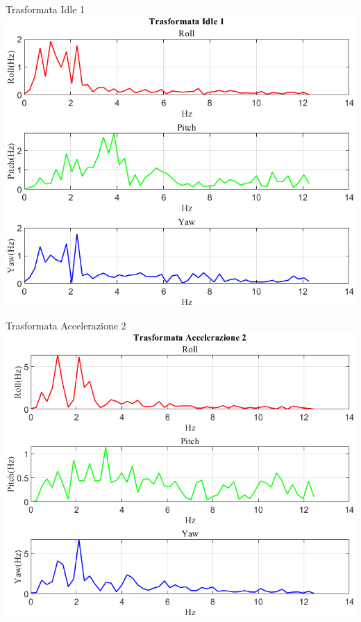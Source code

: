 \documentclass[beamer]{standalone}
\begin{document}
	\begin{frame}{{Trasformata Idle 1}}
		\centering\includegraphics[height=.8\textheight]{figure/VAng/Trasformata/Trasformata Idle 1}
	\end{frame}
	
	\begin{frame}{{Trasformata Accelerazione 2}}
		\centering\includegraphics[height=.8\textheight]{figure/VAng/Trasformata/Trasformata Accelerazione 2}
	\end{frame}
	
\end{document}
